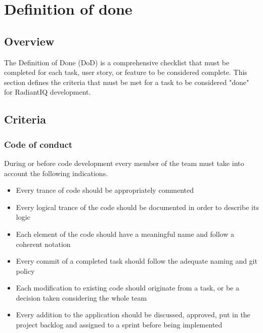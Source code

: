\section{Definition of done} \label{definition_of_done}

\subsection{Overview}

The Definition of Done (DoD) is a comprehensive checklist that must be completed for each task, user story, or feature to be considered complete. This section defines the criteria that must be met for a task to be considered "done" for RadiantIQ development.

\subsection{Criteria}

\subsubsection{Code of conduct}
During or before code development every member of the team must take into account the following indications.
\begin{itemize}
	\item Every trance of code should be appropriately commented
	\item Every logical trance of the code should be documented in order to describe its logic
	\item Each element of the code should have a meaningful name and follow a coherent notation
	\item Every commit of a completed task should follow the adequate naming and git policy
	\item Each modification to existing code should originate from a task, or be a decision taken considering the whole team
	\item Every addition to the application should be discussed, approved, put in the project backlog and assigned to a sprint before being implemented
\end{itemize}


